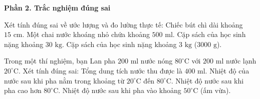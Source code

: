\textbf{Phần 2. Trắc nghiệm đúng sai}

\begin{ex} %
Xét tính đúng sai về ước lượng và đo lường thực tế:
\choiceTF
{\True Chiếc bút chì dài khoảng $15\text{ cm}$.}
{\True Một chai nước khoáng nhỏ chứa khoảng $500\text{ ml}$.}
{Cặp sách của học sinh nặng khoảng $30\text{ kg}$.}
{\True Cặp sách của học sinh nặng khoảng $3\text{ kg}$ ($3000\text{ g}$).}
\end{ex}

\begin{ex} %
Trong một thí nghiệm, bạn Lan pha $200\text{ ml}$ nước nóng $80^\circ\text{C}$ với $200\text{ ml}$ nước lạnh $20^\circ\text{C}$. Xét tính đúng sai:
\choiceTF
{\True Tổng dung tích nước thu được là $400\text{ ml}$.}
{\True Nhiệt độ của nước sau khi pha nằm trong khoảng từ $20^\circ\text{C}$ đến $80^\circ\text{C}$.}
{Nhiệt độ nước sau khi pha cao hơn $80^\circ\text{C}$.}
{\True Nhiệt độ nước sau khi pha vào khoảng $50^\circ\text{C}$ (ấm vừa).}
\end{ex}

